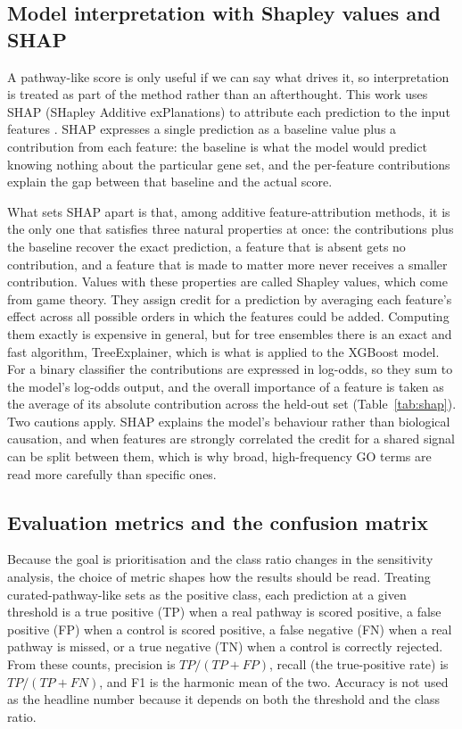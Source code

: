 \documentclass[12pt,twoside]{article}
\begin{document}
\subsection{Model interpretation with Shapley values and SHAP}
\label{sec:methods_shap_background}

A pathway-like score is only useful if we can say what drives it, so interpretation is treated as part of the method rather than an afterthought. This work uses SHAP (SHapley Additive exPlanations) to attribute each prediction to the input features \citep{lundberg2017unified}. SHAP expresses a single prediction as a baseline value plus a contribution from each feature: the baseline is what the model would predict knowing nothing about the particular gene set, and the per-feature contributions explain the gap between that baseline and the actual score.

What sets SHAP apart is that, among additive feature-attribution methods, it is the only one that satisfies three natural properties at once: the contributions plus the baseline recover the exact prediction, a feature that is absent gets no contribution, and a feature that is made to matter more never receives a smaller contribution. Values with these properties are called Shapley values, which come from game theory. They assign credit for a prediction by averaging each feature's effect across all possible orders in which the features could be added. Computing them exactly is expensive in general, but for tree ensembles there is an exact and fast algorithm, TreeExplainer, which is what is applied to the XGBoost model. For a binary classifier the contributions are expressed in log-odds, so they sum to the model's log-odds output, and the overall importance of a feature is taken as the average of its absolute contribution across the held-out set (Table~\ref{tab:shap}). Two cautions apply. SHAP explains the model's behaviour rather than biological causation, and when features are strongly correlated the credit for a shared signal can be split between them, which is why broad, high-frequency GO terms are read more carefully than specific ones.

\subsection{Evaluation metrics and the confusion matrix}
\label{sec:methods_metrics}

Because the goal is prioritisation and the class ratio changes in the sensitivity analysis, the choice of metric shapes how the results should be read. Treating curated-pathway-like sets as the positive class, each prediction at a given threshold is a true positive (TP) when a real pathway is scored positive, a false positive (FP) when a control is scored positive, a false negative (FN) when a real pathway is missed, or a true negative (TN) when a control is correctly rejected. From these counts, precision is $TP/(TP+FP)$, recall (the true-positive rate) is $TP/(TP+FN)$, and F1 is the harmonic mean of the two. Accuracy is not used as the headline number because it depends on both the threshold and the class ratio.
\end{document}
